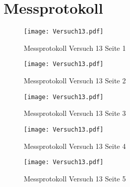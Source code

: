 \section{Messprotokoll}
\begin{figure}[h!]
    \centering
    \texttt{[image: Versuch13.pdf]}
    \caption{Messprotokoll Versuch 13 Seite 1}
\end{figure}
\clearpage
\newpage
\begin{figure}[h!]
    \centering
    \texttt{[image: Versuch13.pdf]}
    \caption{Messprotokoll Versuch 13 Seite 2}
\end{figure}
\newpage
\begin{figure}[h!]
    \centering
    \texttt{[image: Versuch13.pdf]}
    \caption{Messprotokoll Versuch 13  Seite 3}
\end{figure}
\newpage
\begin{figure}[h!]
    \centering
    \texttt{[image: Versuch13.pdf]}
    \caption{Messprotokoll Versuch 13 Seite 4}
\end{figure}
\newpage
\begin{figure}[h!]
    \centering
    \texttt{[image: Versuch13.pdf]}
    \caption{Messprotokoll Versuch 13  Seite 5}
\end{figure}
\newpage
